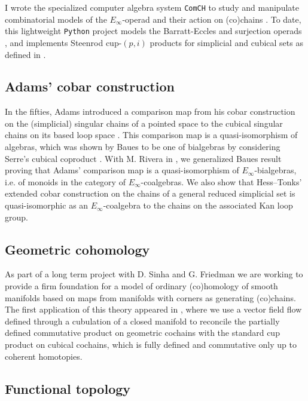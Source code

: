 I wrote the specialized computer algebra system \texttt{ComCH} to study and manipulate combinatorial models of the $E_\infty$-operad and their action on (co)chains \cite{medina2021computer}.
To date, this lightweight \texttt{Python} project models the Barratt-Eccles and surjection operads \cite{mcclure2003multivariable,berger2004combinatorial}, and implements Steenrod cup-$(p,i)$ products for simplicial and cubical sets as defined in \cite{medina2020maysteenrod}.

\subsection{Adams' cobar construction}

In the fifties, Adams introduced a comparison map from his cobar construction on the (simplicial) singular chains of a pointed space to the cubical singular chains on its based loop space \cite{adams1956cobar}.
This comparison map is a quasi-isomorphism of algebras, which was shown by Baues to be one of bialgebras by considering Serre's cubical coproduct \cite{baues1998hopf}.
With M. Rivera in \cite{medina2021cobar}, we generalized Baues result proving that Adams' comparison map is a quasi-isomorphism of $E_{\infty}$-bialgebras, i.e. of monoids in the category of $E_{\infty}$-coalgebras.
We also show that Hess--Tonks' extended cobar construction \cite{hess2010cobar} on the chains of a general reduced simplicial set is quasi-isomorphic as an $E_{\infty}$-coalgebra to the chains on the associated Kan loop group.

\subsection{Geometric cohomology} \label{ss:flows}

As part of a long term project with D. Sinha and G. Friedman we are working to provide a firm foundation for a model of ordinary (co)homology of smooth manifolds based on maps from manifolds with corners as generating (co)chains.
The first application of this theory appeared in \cite{medina2021flowing}, where we use a vector field flow defined through a cubulation of a closed manifold to reconcile the partially defined commutative product on geometric cochains with the standard cup product on cubical cochains, which is fully defined and commutative only up to coherent homotopies.

\subsection{Functional topology}

